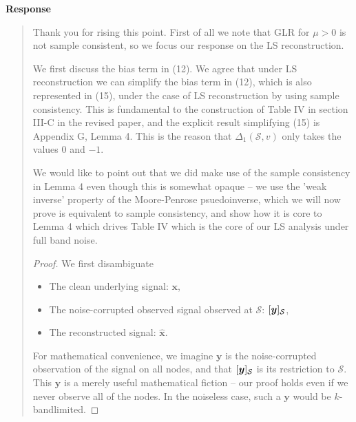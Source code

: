 \documentclass[11pt,onecolumn,journal]{IEEEtran}
\newcommand{\vect}[1]{\bm{#1}}
\theoremstyle{definition}
\newcommand{\set}[1]{\mathcal{#1}}
\begin{document}
\textbf{Response}
\begin{quote}
Thank you for rising this point. First of all we note that GLR for $\mu>0$ is not sample consistent, so we focus our response on the LS reconstruction.

We first discuss the bias term in (12). We agree that under LS reconstruction we can simplify the bias term in (12), which is also represented in (15), under the case of LS reconstruction by using sample consistency. This is fundamental to the construction of Table IV in section III-C in the revised paper, and the explicit result simplifying (15) is Appendix G, Lemma 4. This is the reason that $\Delta_{1}(\set{S},v)$ only takes the values $0$ and $-1$.

We would like to point out that we did make use of the sample consistency in Lemma 4 even though this is somewhat opaque -- we use the 'weak inverse' property of the Moore-Penrose psuedoinverse, which we will now prove is equivalent to sample consistency, and show how it is core to Lemma 4 which drives Table IV which is the core of our LS analysis under full band noise.

\begin{proof}
We first disambiguate
\begin{itemize}
    \item The clean underlying signal: $\vect{x}$,
    \item The noise-corrupted observed signal observed at $\set{S}$: $\vectsub[S]{y}$,
    \item The reconstructed signal: $\hat{\vect{x}}$.
\end{itemize}
For mathematical convenience, we imagine $\vect{y}$ is the noise-corrupted observation of the signal on all nodes, and that $\vectsub[S]{y}$ is its restriction to $\set{S}$. This $\vect{y}$ is a merely useful mathematical fiction -- our proof holds even if we never observe all of the nodes. In the noiseless case, such a $\vect{y}$ would be $k$-bandlimited.


\end{proof}
\end{quote}
\end{document}
